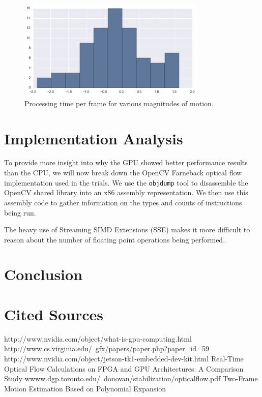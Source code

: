 \documentclass{article}
\begin{document}
\begin{figure}[H]
  \centering
    \includegraphics[width=0.8\textwidth]{test_flow.png}
  \caption{Processing time per frame for various magnitudes of motion.}
\end{figure}

\section{Implementation Analysis}
To provide more insight into why the GPU showed better performance results than
the CPU, we will now break down the OpenCV Farneback optical flow implementation
used in the trials. We use the \texttt{objdump} tool to disassemble the OpenCV
shared library into an x86 assembly representation. We then use this assembly
code to gather information on the types and counts of instructions being run.

The heavy use of Streaming SIMD Extensions (SSE) makes it more difficult to
reason about the number of floating point operations being performed.

\section{Conclusion}

\section{Cited Sources}
\begin{thebibliography}{10}
http://www.nvidia.com/object/what-is-gpu-computing.html
http://www.cs.virginia.edu/~gfx/papers/paper.php?paper_id=59
http://www.nvidia.com/object/jetson-tk1-embedded-dev-kit.html
Real-Time Optical Flow Calculations on FPGA and GPU Architectures: A Comparison
Study
wwww.dgp.toronto.edu/~donovan/stabilization/opticalflow.pdf
Two-Frame Motion Estimation Based on Polynomial Expansion
\end{thebibliography}
\end{document}
